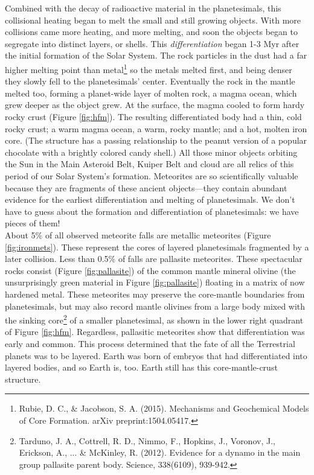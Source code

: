 Combined with the decay of radioactive material in the planetesimals, this collisional heating began to melt the small and still growing objects. With more collisions came more heating, and more melting, and soon the objects began to segregate into distinct layers, or shells. This \emph{differentiation} began 1-3 Myr after the initial formation of the Solar System. The rock particles in the dust had a far higher melting point than metal\footnote{Rubie, D. C., \& Jacobson, S. A. (2015). Mechanisms and Geochemical Models of Core Formation. arXiv preprint:1504.05417.} so the metals melted first, and being denser they slowly fell to the planetesimals' center. Eventually the rock in the mantle melted too, forming a planet-wide layer of molten rock, a magma ocean, which grew deeper as the object grew. At the surface, the magma cooled to form hardy rocky crust (Figure \ref{fig:hfm}). The resulting differentiated body had a thin, cold rocky crust; a warm magma ocean, a warm, rocky mantle; and a hot, molten iron core. (The structure has a passing relationship to the peanut version of a popular chocolate with a brightly colored candy shell.) All those minor objects orbiting the Sun in the Main Asteroid Belt, Kuiper Belt and  cloud are all relics of this period of our Solar System's formation. Meteorites are so scientifically valuable because they are fragments of these ancient objects---they contain abundant evidence for the earliest differentiation and melting of planetesimals. We don't have to guess about the formation and differentiation of planetesimals: we have pieces of them!\\

About 5\% of all observed meteorite falls are metallic meteorites (Figure \ref{fig:ironmets}). These represent the cores of layered planetesimals fragmented by a later collision. Less than 0.5\% of falls are pallasite meteorites. These spectacular rocks consist (Figure \ref{fig:pallasite}) of the common mantle mineral olivine (the unsurprisingly green material in Figure \ref{fig:pallasite}) floating in a matrix of now hardened metal. These meteorites may preserve the core-mantle boundaries from planetesimals, but may also record mantle olivines from a large body mixed with the sinking core\footnote{Tarduno, J. A., Cottrell, R. D., Nimmo, F., Hopkins, J., Voronov, J., Erickson, A., ... \& McKinley, R. (2012). Evidence for a dynamo in the main group pallasite parent body. Science, 338(6109), 939-942.} of a smaller planetesimal, as shown in the lower right quadrant of Figure \ref{fig:hfm}. Regardless, pallasitic meteorites show that differentiation was early and common. This process determined that the fate of all the Terrestrial planets was to be layered. Earth was born of embryos that had differentiated into layered bodies, and so Earth is, too. Earth still has this core-mantle-crust structure.


